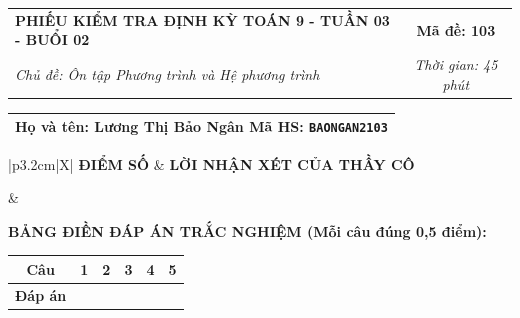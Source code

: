 \documentclass[12pt,a4paper]{article}
\begin{document}
\newpage


\noindent
\begin{tabularx}{\linewidth}{|X|c|}
\hline
\textbf{PHIẾU KIỂM TRA ĐỊNH KỲ TOÁN 9 - TUẦN 03 - BUỔI 02} & \textbf{Mã đề: 103} \\
\textit{Chủ đề: Ôn tập Phương trình và Hệ phương trình} & \textit{Thời gian: 45 phút} \\
\hline
\end{tabularx}

\vspace{1mm}

\noindent
\begin{tabularx}{\linewidth}{|X|}
\hline
\rule[-2mm]{0pt}{7.5mm}\textbf{Họ và tên:} \textbf{\large Lương Thị Bảo Ngân} \hfill \textbf{Mã HS:} \texttt{BAONGAN2103} \quad \\
\hline
\end{tabularx}

\vspace{1mm}

\noindent
\begin{tabularx}{\linewidth}{|p{3.2cm}|X|}
\hline
\centering\textbf{ĐIỂM SỐ} & \centering\textbf{LỜI NHẬN XÉT CỦA THẦY CÔ} \tabularnewline
\hline
\rule{0pt}{1.3cm} & \tabularnewline
\hline
\end{tabularx}

\vspace{1.2mm}

\noindent\textbf{BẢNG ĐIỀN ĐÁP ÁN TRẮC NGHIỆM (Mỗi câu đúng 0,5 điểm):}
\vspace{0.8mm}

\noindent
\renewcommand{\arraystretch}{1.35}
\begin{tabularx}{\linewidth}{|c|*{5}{>{\centering\arraybackslash}X|}}
\hline
\textbf{Câu} & \textbf{1} & \textbf{2} & \textbf{3} & \textbf{4} & \textbf{5} \\
\hline
\textbf{Đáp án} & & & & & \\
\hline
\end{tabularx}
\renewcommand{\arraystretch}{1.0}

\vspace{1.5mm}
\end{document}
